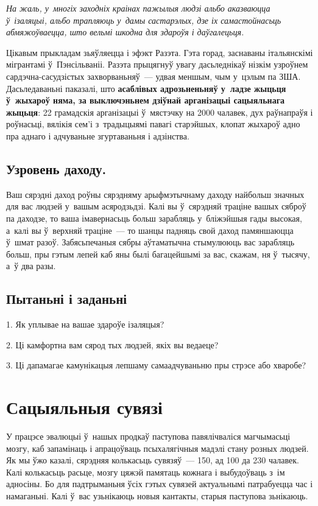 \emph{На жаль, у~многіх заходніх краінах пажылыя людзі альбо аказваюцца ў~ізаляцыі, альбо трапляюць у~дамы састарэлых, дзе іх самастойнасьць абмяжоўваецца, што вельмі шкодна для здароўя і даўгалецьця.}

Цікавым прыкладам зьяўляецца і эфэкт Разэта. Гэта горад, заснаваны італьянскімі мігрантамі ў~Пэнсільваніі. Разэта прыцягнуў увагу дасьледнікаў нізкім узроўнем сардэчна-сасудзістых захворваньняў~--- удвая меншым, чым у~цэлым па ЗША. Дасьледаваньні паказалі, што \textbf{асаблівых адрозьненьняў у~ладзе жыцьця ў~жыхароў няма, за выключэньнем дзіўнай арганізацыі сацыяльнага жыцьця}: 22 грамадскія арганізацыі ў~мястэчку на 2000 чалавек, дух раўнапраўя і роўнасьці, вялікія сем'і з~традыцыямі павагі старэйшых, клопат жыхароў адно пра аднаго і адчуваньне згуртаваньня і адзінства.

\subsection*{Узровень даходу.}

Ваш сярэдні даход роўны сярэдняму арыфмэтычнаму даходу найбольш значных для вас людзей у~вашым асяродзьдзі. Калі вы ў~сярэдняй траціне вашых сяброў па даходзе, то ваша імавернасьць больш зарабляць у~бліжэйшыя гады высокая, а~калі вы ў~верхняй траціне~--- то шанцы падняць свой даход памяншаюцца ў~шмат разоў. Забясьпечаныя сябры аўтаматычна стымулююць вас зарабляць больш, пры гэтым лепей каб яны былі багацейшымі за вас, скажам, ня ў~тысячу, а~ў два разы.

\subsection*{Пытаньні і заданьні}

1. Як уплывае на вашае здароўе ізаляцыя?

2. Ці камфортна вам сярод тых людзей, якіх вы ведаеце?

3. Ці дапамагае камунікацыя лепшаму самаадчуваньню пры стрэсе або хваробе?


\section{Сацыяльныя сувязі}

У працэсе эвалюцыі ў~нашых продкаў паступова павялічваліся магчымасьці мозгу, каб запамінаць і апрацоўваць псыхалягічныя мадэлі стану розных людзей. Як мы ўжо казалі, сярэдняя колькасьць сувязяў~--- 150, ад 100 да 230 чалавек. Калі колькасьць расьце, мозгу цяжэй памятаць кожнага і выбудоўваць з~ім адносіны. Бо для падтрыманьня ўсіх гэтых сувязей актуальнымі патрабуецца час і намаганьні. Калі ў~вас узьнікаюць новыя кантакты, старыя паступова зьнікаюць.

